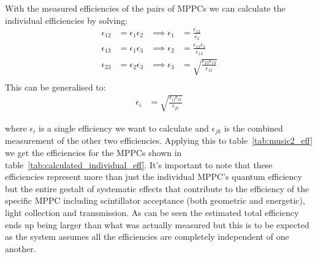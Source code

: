 With the measured efficiencies of the pairs of MPPCs we can calculate the individual efficiencies by solving:
\begin{align*}
  \epsilon_{12} &= \epsilon_{1} \epsilon_{2} &\implies   \epsilon_{1}  &= \frac{\epsilon_{12}}{\epsilon_{2}}                       \\
  \epsilon_{13} &= \epsilon_{1} \epsilon_{3} &\implies   \epsilon_{2}  &= \frac{\epsilon_{12}\epsilon_{3}}{\epsilon_{13}}          \\
  \epsilon_{23} &= \epsilon_{2} \epsilon_{3} &\implies   \epsilon_{3}  &= \sqrt{\frac{\epsilon_{23}\epsilon_{13}}{\epsilon_{12}}}  \\
\end{align*} 
This can be generalised to:
\begin{align*}
  \epsilon_{i} &= \sqrt{\frac{\epsilon_{ij}\epsilon_{ik}}{\epsilon_{jk}}}
\end{align*}

where \( \epsilon_i \) is a single efficiency we want to calculate and \( \epsilon_{jk} \) is the combined measurement of the other two efficiencies. Applying this to table~\ref{tab:music2_eff} we get the efficiencies for the MPPCs shown in table~\ref{tab:calculated_individual_eff}. It's important to note that these efficiencies represent more than just the individual MPPC's quantum efficiency but the entire gestalt of systematic effects that contribute to the efficiency of the specific MPPC including scintillator acceptance (both geometric and energetic), light collection and transmission. As can be seen the estimated total efficiency ends up being larger than what was actually measured but this is to be expected as the system assumes all the efficiencies are completely independent of one another. 

